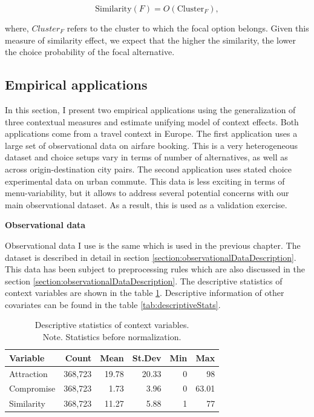 \documentclass[a4paper,12pt]{article}
\begin{document}
 $$\text{Similarity}(F) = O(\text{Cluster}_F) ,
$$

where, $Cluster_F$ refers to the cluster to which the focal option belongs. Given this measure of similarity effect, we expect that the higher the similarity, the lower the choice probability of the focal alternative.

\subsection{Empirical applications}

In this section, I present two empirical applications using the generalization of three contextual measures and estimate unifying model of context effects. Both applications come from a travel context in Europe. The first application uses a large set of observational data on airfare booking. This is a very heterogeneous dataset and choice setups vary in terms of number of alternatives, as well as across origin-destination city pairs. The second application uses stated choice experimental data on urban commute. This data is less exciting in terms of menu-variability, but it allows to address several potential concerns with our main observational dataset. As a result, this is used as a validation exercise. 

\textbf{Observational data}\label{section:additionalPreprocessingObservationalData}

Observational data I use is the same which is used in the previous chapter. The dataset is described in detail in section \ref{section:observationalDataDescription}. This data has been subject to preprocessing rules which are also discussed in the section \ref{section:observationalDataDescription}. The descriptive statistics of context variables are shown in the table \ref{tab:descriptivesContextOnly}. Descriptive information of other covariates can be found in the table \ref{tab:descriptiveStats}.

\begin{table}[ht]
\centering
\begin{tabular}{lrrrrr}
\hline
Variable & Count & Mean & St.Dev & Min & Max \\
\hline
Attraction & 368,723 & 19.78 & 20.33 & 0 & 98 \\
Compromise & 368,723 & 1.73 & 3.96 & 0 & 63.01 \\
Similarity & 368,723 & 11.27 & 5.88 & 1 & 77 \\
\hline
\end{tabular}
\caption[Descriptive statistis of context variables]{Descriptive statistics of context variables. \\ Note. Statistics before normalization.}
\label{tab:descriptivesContextOnly}
\end{table}
\end{document}
